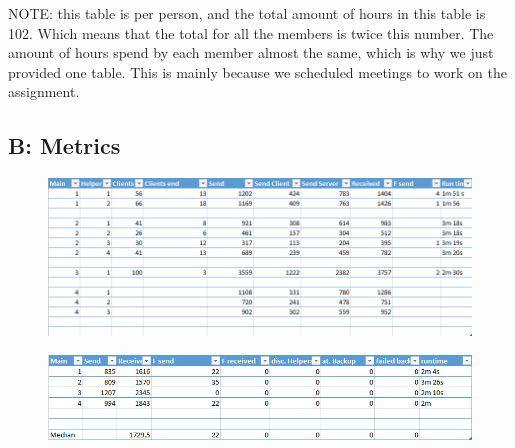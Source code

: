 NOTE: this table is per person, and the total amount of hours in this table is 102.
Which means that the total for all the members is twice this number.
The amount of hours spend by each member almost the same, which is why we just provided one table.
This is mainly because we scheduled meetings to work on the assignment.

\subsection{B: Metrics}
\begin{figure}[ht]
\includegraphics[scale=0.5]{M1.png}
\end{figure}

\begin{figure}[ht]
\includegraphics[scale=0.5]{M2.png}
\end{figure}


